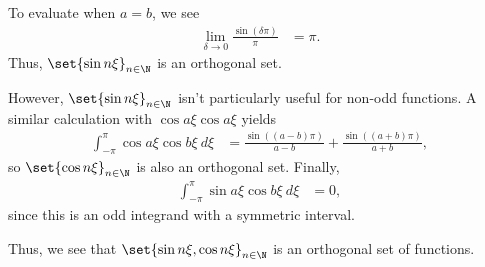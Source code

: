 \documentclass[10pt]{mypackage}
\begin{document}
To evaluate when $a = b$, we see
\begin{align*}
  \lim_{\delta \rightarrow 0}\frac{\sin\left(\delta \pi\right)}{\pi} &= \pi.
\end{align*}
Thus, $\set{\sin n\xi}_{n\in \N}$ is an orthogonal set.\newline

However, $\set{\sin n\xi}_{n\in \N}$ isn't particularly useful for non-odd functions. A similar calculation with $\cos a\xi \cos a\xi$ yields
\begin{align*}
                                                \int_{-\pi}^{\pi} \cos a\xi \cos b\xi\:d\xi &= \frac{\sin\left(\left(a-b\right)\pi\right)}{a-b} + \frac{\sin\left(\left(a+b\right)\pi\right)}{a+b},
\end{align*}
so $\set{\cos n\xi}_{n\in \N}$ is also an orthogonal set. Finally, 
\begin{align*}
  \int_{-\pi}^{\pi} \sin a\xi \cos b\xi\:d\xi &= 0,
\end{align*}
since this is an odd integrand with a symmetric interval.\newline

Thus, we see that $\set{\sin n\xi, \cos n\xi}_{n\in \N}$ is an orthogonal set of functions.\newline
\end{document}
